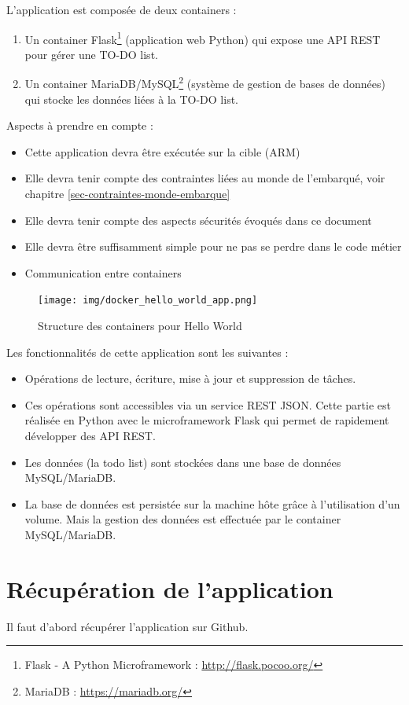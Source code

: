 \documentclass[11pt,a4paper,oneside]{report}
\begin{document}
L'application est composée de deux containers :
\begin{enumerate}
\item Un container Flask\footnote{Flask - A Python Microframework : \url{http://flask.pocoo.org/}} (application web Python) qui expose une API REST pour gérer une TO-DO list.
\item Un container MariaDB/MySQL\footnote{MariaDB : \url{https://mariadb.org/}} (système de gestion de bases de données) qui stocke les données liées à la TO-DO list.
\end{enumerate}

Aspects à prendre en compte :
\begin{itemize}
\item Cette application devra être exécutée sur la cible (ARM)
\item Elle devra tenir compte des contraintes liées au monde de l'embarqué, voir chapitre \ref{sec-contraintes-monde-embarque}
\item Elle devra tenir compte des aspects sécurités évoqués dans ce document
\item Elle devra être suffisamment simple pour ne pas se perdre dans le code métier
\item Communication entre containers 
\end{itemize}

\begin{figure}[H]
\centering
\texttt{[image: img/docker\_hello\_world\_app.png]}
\caption{Structure des containers pour Hello World}
\end{figure}


Les fonctionnalités de cette application sont les suivantes :
\begin{itemize}
\item Opérations de lecture, écriture, mise à jour et suppression de tâches.
\item Ces opérations sont accessibles via un service REST JSON. Cette partie est réalisée en Python avec le microframework Flask qui permet de rapidement développer des API REST.
\item Les données (la todo list) sont stockées dans une base de données MySQL/MariaDB.
\item La base de données est persistée sur la machine hôte grâce à l'utilisation d'un volume. Mais la gestion des données est effectuée par le container MySQL/MariaDB.
\end{itemize}


\newpage
\section{Récupération de l'application}
Il faut d'abord récupérer l'application sur Github.
\end{document}

